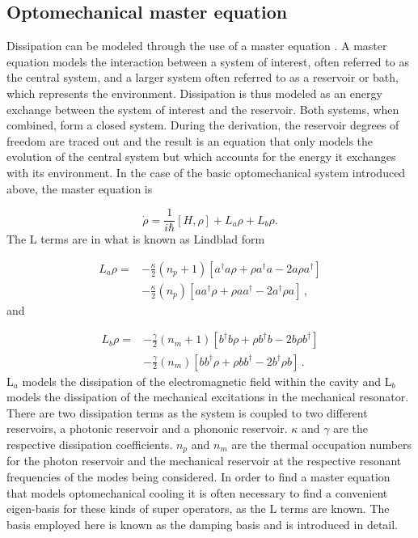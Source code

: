 \documentclass[12pt]{article}
\begin{document}
\subsection{Optomechanical master equation}

Dissipation can be modeled through the use of a master equation \cite{CarmichaelQuantumOptics1999}. A master equation models the interaction between a system of interest, often referred to as the central system, and a larger system often referred to as a reservoir or bath, which represents the environment. Dissipation is thus modeled as an energy exchange between the system of interest and the reservoir. Both systems, when combined, form a closed system. During the derivation, the reservoir degrees of freedom are traced out and the result is an equation that only models the evolution of the central system but which accounts for the energy it exchanges with its environment. In the case of the basic optomechanical system introduced above, the master equation is

\begin{equation} \label{eq:OptoMechanicalMasterEquation}
\dot{\rho} = \frac{1}{i\hbar}[H,\rho] +L_a\rho + L_b \rho.
\end{equation} The $\mathrm{L}$ terms are in what is known as Lindblad form 

\begin{align}
L_a \rho =& - \frac{\kappa}{2}(n_p + 1)[a^\dagger a\rho + \rho a^\dagger a -2a\rho a^\dagger]  \\
 &- \frac{\kappa}{2}(n_p)[ aa^\dagger\rho + \rho  aa^\dagger -2a^\dagger\rho a]\, ,\nonumber
\end{align} and

\begin{align}
L_b \rho =& - \frac{\gamma}{2}(n_m + 1)[b^\dagger b\rho + \rho b^\dagger b -2b\rho b^\dagger]  \\
 &- \frac{\gamma}{2}(n_m)[ bb^\dagger\rho + \rho  bb^\dagger -2b^\dagger\rho b]\, .\nonumber
\end{align} $\mathrm{L}_a$ models the dissipation of the electromagnetic field within the cavity and $\mathrm{L}_b$ models the dissipation of the mechanical excitations in the mechanical resonator. There are two dissipation terms as the system is coupled to two different reservoirs, a photonic reservoir and a phononic reservoir. $\kappa$ and $\gamma$ are the respective dissipation coefficients. $n_p$ and $n_m$ are the thermal occupation numbers for the photon reservoir and the mechanical reservoir at the respective resonant frequencies of the modes being considered. In order to find a master equation that models optomechanical cooling it is often necessary to find a convenient eigen-basis for these kinds of super operators, as the $\mathrm{L}$ terms are known. The basis employed here is known as the damping basis and is introduced in detail. 
\end{document}
